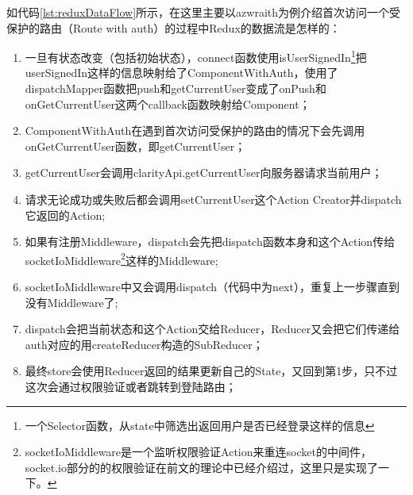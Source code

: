 如代码\ref{lst:reduxDataFlow}所示，在这里主要以azwraith为例介绍首次访问一个受保护的路由（Route with auth）的过程中Redux的数据流是怎样的：
\begin{enumerate}
  \item 一旦有状态改变（包括初始状态），connect函数使用isUserSignedIn\footnote{一个Selector函数，从state中筛选出返回用户是否已经登录这样的信息}把userSignedIn这样的信息映射给了ComponentWithAuth，使用了dispatchMapper函数把push和getCurrentUser变成了onPush和onGetCurrentUser这两个callback函数映射给Component；
  \item ComponentWithAuth在遇到首次访问受保护的路由的情况下会先调用onGetCurrentUser函数，即getCurrentUser；
  \item getCurrentUser会调用clarityApi.getCurrentUser向服务器请求当前用户；
  \item 请求无论成功或失败后都会调用setCurrentUser这个Action Creator并dispatch它返回的Action;
  \item 如果有注册Middleware，dispatch会先把dispatch函数本身和这个Action传给socketIoMiddleware\footnote{socketIoMiddleware是一个监听权限验证Action来重连socket的中间件，socket.io部分的的权限验证在前文的理论中已经介绍过，这里只是实现了一下。}这样的Middleware;
  \item socketIoMiddleware中又会调用dispatch（代码中为next），重复上一步骤直到没有Middleware了;
  \item dispatch会把当前状态和这个Action交给Reducer，Reducer又会把它们传递给auth对应的用createReducer构造的SubReducer；
  \item 最终store会使用Reducer返回的结果更新自己的State，又回到第1步，只不过这次会通过权限验证或者跳转到登陆路由；
\end{enumerate}
